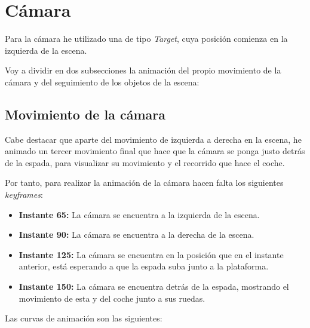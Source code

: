 \section{Cámara}

Para la cámara he utilizado una de tipo \textit{Target}, cuya posición comienza en la izquierda de la escena.

Voy a dividir en dos subsecciones la animación del propio movimiento de la cámara y del seguimiento de los objetos de la escena:

\subsection{Movimiento de la cámara}

Cabe destacar que aparte del movimiento de izquierda a derecha en la escena, he animado un tercer movimiento final que hace que la cámara se ponga justo detrás de la espada, para visualizar su movimiento y el recorrido que hace el coche.

\bigskip

Por tanto, para realizar la animación de la cámara hacen falta los siguientes \textit{keyframes}:

\begin{itemize}
    \item \textbf{Instante 65: }La cámara se encuentra a la izquierda de la escena.
    \item \textbf{Instante 90: }La cámara se encuentra a la derecha de la escena.
    \item \textbf{Instante 125: }La cámara se encuentra en la posición que en el instante anterior, está esperando a que la espada suba junto a la plataforma.
    \item \textbf{Instante 150: }La cámara se encuentra detrás de la espada, mostrando el movimiento de esta y del coche junto a sus ruedas.
\end{itemize}

\bigskip

Las curvas de animación son las siguientes: 

